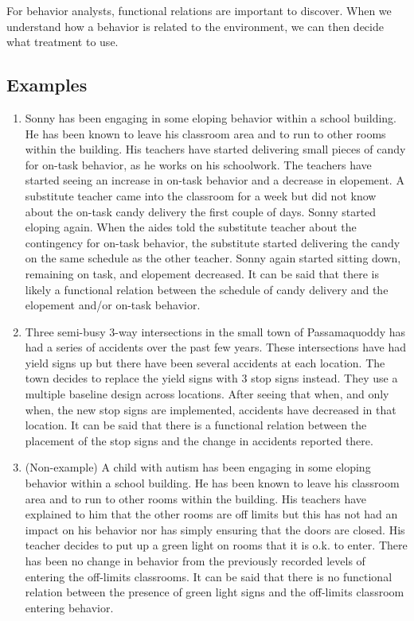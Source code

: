 For behavior analysts, functional relations are important to discover. When we understand how a behavior is related to the environment, we can then decide what treatment to use.\\
%
\subsection{Examples}
\begin{enumerate}
\item Sonny has been engaging in some eloping behavior within a school building.  He has been known to leave his classroom area and to run to other rooms within the building. His teachers have started delivering small pieces of candy for on-task behavior, as he works on his schoolwork. The teachers have started seeing an increase in on-task behavior and a decrease in elopement. A substitute teacher came into the classroom for a week but did not know about the on-task candy delivery the first couple of days.   Sonny started eloping again. When the aides told the substitute teacher about the contingency for on-task behavior, the substitute started delivering the candy on the same schedule as the other teacher. Sonny again started sitting down, remaining on task, and elopement decreased. It can be said that there is likely a functional relation between the schedule of candy delivery and the elopement and/or on-task behavior.
\item Three semi-busy 3-way intersections in the small town of Passamaquoddy has had a series of accidents over the past few years.  These intersections have had yield signs up but there have been several accidents at each location.  The town decides to replace the yield signs with 3 stop signs instead. They use a multiple baseline design across locations. After seeing that when, and only when, the new stop signs are implemented, accidents have decreased in that location. It can be said that there is a functional relation between the placement of the stop signs and the change in accidents reported there.  
%
\item (Non-example) A child with autism has been engaging in some eloping behavior within a school building.  He has been known to leave his classroom area and to run to other rooms within the building. His teachers have explained to him that the other rooms are off limits but this has not had an impact on his behavior nor has simply ensuring that the doors are closed. His teacher decides to put up a green light on rooms that it is o.k. to enter.  There has been no change in behavior from the previously recorded levels of entering the off-limits classrooms.  It can be said that there is no functional relation between the presence of green light signs and the off-limits classroom entering behavior.
%
\end{enumerate}
%

